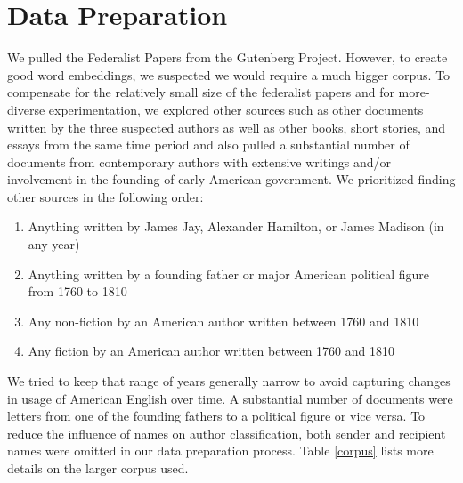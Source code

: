 \documentclass[11pt]{article}
\begin{document}
\section{Data Preparation}
We pulled the Federalist Papers from the Gutenberg Project. However, to create good word embeddings, we suspected we would require a much bigger corpus. To compensate for the relatively small size of the federalist papers and for more-diverse experimentation, we explored other sources such as other documents written by the three suspected authors as well as other books, short stories, and essays from the same time period and also pulled a substantial number of documents from contemporary authors with extensive writings and/or involvement in the founding of early-American government. We prioritized finding other sources in the following order:
\begin{enumerate}
	\item Anything written by James Jay, Alexander Hamilton, or James Madison (in any year)
	\item Anything written by a founding father or major American political figure from 1760 to 1810
	\item Any non-fiction by an American author written between 1760 and 1810
	\item Any fiction by an American author written between 1760 and 1810
\end{enumerate}
We tried to keep that range of years generally narrow to avoid capturing changes in usage of American English over time. A substantial number of documents were letters from one of the founding fathers to a political figure or vice versa. To reduce the influence of names on author classification, both sender and recipient names were omitted in our data preparation process. Table \ref{corpus} lists more details on the larger corpus used.
\end{document}
